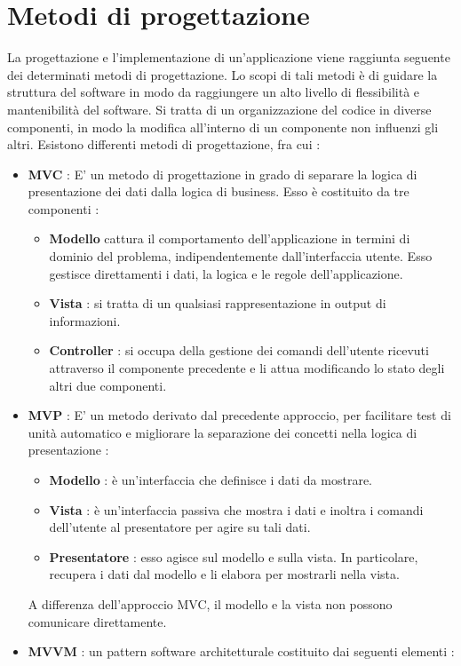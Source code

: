 \documentclass[12pt]{report}
\begin{document}
\section{Metodi di progettazione}
La progettazione e l'implementazione di un'applicazione viene raggiunta seguente dei determinati metodi di progettazione. Lo scopi di tali metodi è di guidare la struttura del software in modo da raggiungere un alto livello di flessibilità e mantenibilità del software. Si tratta di un organizzazione del codice in diverse componenti, in modo la modifica all'interno di un componente non influenzi gli altri. Esistono differenti metodi di progettazione, fra cui :
\begin{itemize}
\item \textbf{MVC} : E' un metodo di progettazione in grado di separare la logica di presentazione dei dati dalla logica di business. Esso è costituito da tre componenti : 
\begin{itemize}
\item \textbf{Modello} cattura il comportamento dell'applicazione in termini di dominio del problema, indipendentemente dall'interfaccia utente. Esso gestisce direttamenti i dati, la logica e le regole dell'applicazione.
\item \textbf{Vista} : si tratta di un qualsiasi rappresentazione in output di informazioni.
\item \textbf{Controller} : si occupa della gestione dei comandi dell'utente ricevuti attraverso il componente precedente e li attua modificando lo stato degli altri due componenti.
\end{itemize}
\item \textbf{MVP} : E' un metodo derivato dal precedente approccio, per facilitare test di unità automatico e migliorare la separazione dei concetti nella logica di presentazione :
\begin{itemize}
\item \textbf{Modello} : è un'interfaccia che definisce i dati da mostrare.
\item \textbf{Vista} : è un'interfaccia passiva che mostra i dati e inoltra i comandi dell'utente al presentatore per agire su tali dati.
\item \textbf{Presentatore} : esso agisce sul modello e sulla vista. In particolare, recupera i dati dal modello e li elabora per mostrarli nella vista.
\end{itemize}
A differenza dell'approccio MVC, il modello e la vista non possono comunicare direttamente.
\item \textbf{MVVM} : un pattern software architetturale costituito dai seguenti elementi :

\end{itemize}
\end{document}

